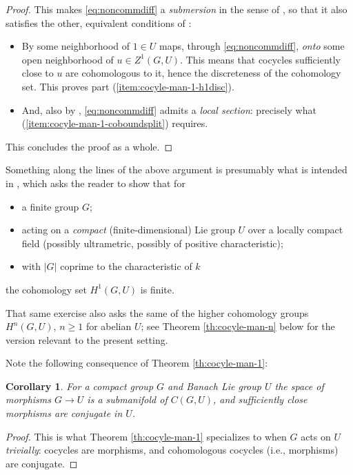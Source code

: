 \documentclass[10pt,a4paper]{amsart}
\numberwithin{equation}{section}
\newtheorem{Corollary}[Theorem]{Corollary}
\begin{document}
\begin{proof}
 This makes \eqref{eq:noncommdiff} a {\it submersion} in the sense of \cite[Section~5.9.1\,(i)]{bourb-vars-17}, so that it also satisfies the other, equivalent conditions of \cite[Section~5.9.1]{bourb-vars-17}:
 \begin{itemize}\itemsep=0pt
 \item By \cite[Section~5.9.1\,(iv)]{bourb-vars-17} some neighborhood of $1\in U$ maps, through \eqref{eq:noncommdiff}, {\it onto} some open neighborhood of $u\in Z^1(G,U)$. This means that cocycles sufficiently close to $u$ are cohomologous to it, hence the discreteness of the cohomology set. This proves part (\ref{item:cocyle-man-1-h1disc}).
 \item And, also by \cite[Section~5.9.1\,(iv)]{bourb-vars-17}, \eqref{eq:noncommdiff} admits a {\it local section}: precisely what (\ref{item:cocyle-man-1-coboundsplit}) requires.
 \end{itemize}
 This concludes the proof as a whole.
\end{proof}


\begin{Remark}\label{re:serrex}
 Something along the lines of the above argument is presumably what is intended in \cite[Part II, Chapter IV, Exercise 1]{ser-lag}, which asks the reader to show that for
 \begin{itemize}\itemsep=0pt
 \item a finite group $G$;
 \item acting on a {\it compact} (finite-dimensional) Lie group $U$ over a locally compact field (possibly ultrametric, possibly of positive characteristic);
 \item with $|G|$ coprime to the characteristic of $k$
 \end{itemize}
 the cohomology set $H^1(G,U)$ is finite.

 That same exercise also asks the same of the higher cohomology groups $H^n(G,U)$, $n\ge 1$ for abelian $U$; see Theorem \ref{th:cocyle-man-n} below for the version relevant to the present setting.
\end{Remark}

Note the following consequence of Theorem \ref{th:cocyle-man-1}:

\begin{Corollary}\label{cor:nearbymor}
 For a compact group $G$ and Banach Lie group $U$ the space of morphisms $G\to U$ is a submanifold of $C(G,U)$, and sufficiently close morphisms are conjugate in $U$.
\end{Corollary}
\begin{proof}
 This is what Theorem \ref{th:cocyle-man-1} specializes to when $G$ acts on $U$ {\it trivially}: cocycles are morphisms, and cohomologous cocycles (i.e., morphisms) are conjugate.
\end{proof}
\end{document}
